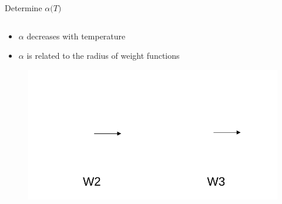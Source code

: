 \documentclass{beamer}
\begin{document}
\begin{frame}{Determine $\alpha{(}T)$}
\begin{columns}[t]
\begin{block}{}
\begin{itemize}
			    \item $\alpha$ decreases with temperature 
			    \item $\alpha$ is related to the radius of weight functions
			\end{itemize}
        \begin{figure}
            \centering
            \includegraphics[width=\columnwidth]{figs/w2-w3-radius}
          \end{figure}
	    \end{block}          
	\end{columns}	
\end{frame}
\end{document}
